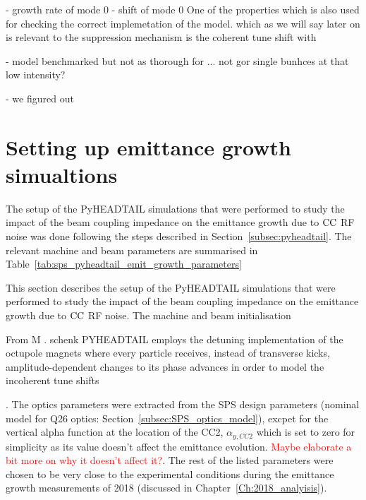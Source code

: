 - growth rate of mode 0
- shift of mode 0
One of the properties which is also used for checking the correct implemetation of the model. which as we will say later on is relevant to the suppression mechanism is the coherent tune shift with 

- model benchmarked but not as thorough for ... not gor single bunhces at that low intensity?

- we figured out


\section{Setting up emittance growth simualtions}
The setup of the PyHEADTAIL simulations that were performed to study the impact of the beam coupling impedance on the emittance growth due to ${\mathrm{CC}}$ RF noise was done following the steps described in Section~\ref{subsec:pyheadtail}. The relevant machine and beam parameters are summarised in Table~\ref{tab:sps_pyheadtail_emit_growth_parameters}


This section describes the setup of the PyHEADTAIL simulations that were performed to study the impact of the beam coupling impedance on the emittance growth due to ${\mathrm{CC}}$ RF noise. The machine and beam initialisation


From M . schenk
PYHEADTAIL employs the detuning implementation of the octupole magnets where
every particle receives, instead of transverse kicks, amplitude-dependent changes to its phase advances in order to model the incoherent tune shifts



. The optics parameters were extracted from the SPS design parameters (nominal model for Q26 optics: Section~\ref{subsec:SPS_optics_model}), excpet for the vertical alpha function at the location of the CC2, $\alpha_{y, CC2}$ which is set to zero for simplicity as its value doesn't affect the emittance evolution. \textcolor{red}{Maybe elaborate a bit more on why it doesn't affect it?}. The rest of the listed parameters were chosen to be very close to the experimental conditions during the emittance growth measurements of 2018 (discussed in Chapter~\ref{Ch:2018_analyisis}).


